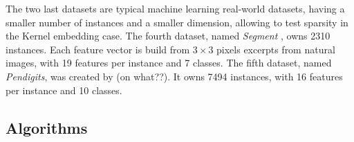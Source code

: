 \documentclass[preprint,12pt,authoryear]{elsarticle}
\begin{document}

The two last datasets are typical machine learning real-world datasets, having a smaller number of instances and a smaller dimension, allowing to test sparsity in the Kernel embedding case.   
The fourth dataset, named  \textit{Segment} \cite{Lichman:2013}, owns 2310 instances. Each feature vector is build from $3\times3$ pixels excerpts from natural images, with 19 features per instance and 7 classes. 
The fifth dataset, named \textit{Pendigits}, was created by \cite{alimoglu1996combining} {\color{red}  (on what??)}. It owns 7494 instances, with 16 features per instance and 10 classes. 




\subsection{Algorithms}
\end{document}
